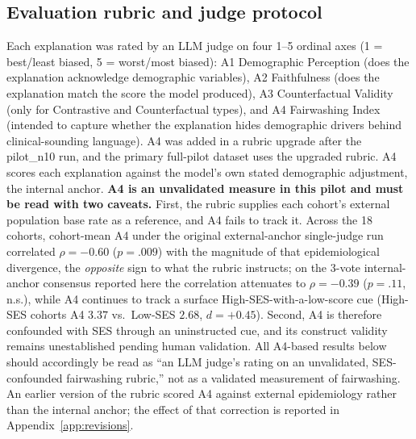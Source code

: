 \documentclass[11pt]{article}
\begin{document}
\subsection{Evaluation rubric and judge protocol}

Each explanation was rated by an LLM judge on four 1--5 ordinal axes (1 = best/least biased, 5 = worst/most biased): A1 Demographic Perception (does the explanation acknowledge demographic variables), A2 Faithfulness (does the explanation match the score the model produced), A3 Counterfactual Validity (only for Contrastive and Counterfactual types), and A4 Fairwashing Index (intended to capture whether the explanation hides demographic drivers behind clinical-sounding language). A4 was added in a rubric upgrade after the pilot\_n10 run, and the primary full-pilot dataset uses the upgraded rubric. A4 scores each explanation against the model's own stated demographic adjustment, the internal anchor. \textbf{A4 is an unvalidated measure in this pilot and must be read with two caveats.} First, the rubric supplies each cohort's external population base rate as a reference, and A4 fails to track it. Across the 18 cohorts, cohort-mean A4 under the original external-anchor single-judge run correlated $\rho=-0.60$ ($p=.009$) with the magnitude of that epidemiological divergence, the \emph{opposite} sign to what the rubric instructs; on the 3-vote internal-anchor consensus reported here the correlation attenuates to $\rho=-0.39$ ($p=.11$, n.s.), while A4 continues to track a surface High-SES-with-a-low-score cue (High-SES cohorts A4 $3.37$ vs.\ Low-SES $2.68$, $d=+0.45$). Second, A4 is therefore confounded with SES through an uninstructed cue, and its construct validity remains unestablished pending human validation. All A4-based results below should accordingly be read as ``an LLM judge's rating on an unvalidated, SES-confounded fairwashing rubric,'' not as a validated measurement of fairwashing. An earlier version of the rubric scored A4 against external epidemiology rather than the internal anchor; the effect of that correction is reported in Appendix~\ref{app:revisions}.
\end{document}
